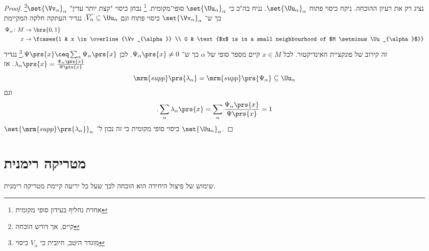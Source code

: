 \documentclass[a4paper,10pt,twoside,openany]{book}
\begin{document}
\begin{proof}
נציג רק את רעיון ההוכחה.
ניקח כיסוי פתוח
$\set{\Uu_{\alpha}}_{\alpha}$.
נניח בה"כ כי
$\set{\Uu_{\alpha}}_{\alpha}$
סופי־מקומית.%
\footnote{
אחרת נחליף בעידון סופי מקומית%
}
נבחן כיסוי "קצת יותר עדין"
$\set{\Vv_{\alpha}}_{\alpha}$\footnote{קיים, אך דורש הוכחה}
כך ש־%
$\set{\Vv_{\alpha}}_{\alpha}$
כיסוי פתוח וגם
$\overline{V_{\alpha}} \subseteq \Uu_{\alpha}$.
נגדיר העתקה חלקה המקיימת
\begin{align*}
\Psi_{\alpha} \colon M &\to \brs{0,1} \\
x &\to \fcases{1 & x \in \overline{\Vv_{\alpha}} \\ 0 & \text{$x$ is in a small neighbourhood of $M \setminus \Uu_{\alpha}$}}
\end{align*}
זה קירוב של פונקציית האינדיקטור.
לכל
$x \in M$
קיים מספר סופי של
$\alpha$
כך ש־%
$\Psi_{\alpha}\prs{x} \neq 0$.
לכן
$\Psi\prs{x} \ceq \sum_{\alpha} \Psi_{\alpha}\prs{x}$.\footnote{מוגדר היטב, חיובית כי
$V_{\alpha}$
כיסוי}
נגדיר
$\lambda_{\alpha}\prs{x} = \frac{\Psi_{\alpha}\prs{x}}{\Psi\prs{x}}$.
אז
\[\mrm{supp}\prs{\lambda_{\alpha}} = \mrm{supp}\prs{\Psi_{\alpha}} \subseteq \Uu_{\alpha}\]
וגם
\[\text{.}\sum_{\alpha} \lambda_{\alpha}\prs{x} = \sum_{\alpha} \frac{\Psi_{\alpha}\prs{x}}{\Psi\prs{x}} = 1\]
$\set{\mrm{supp}\prs{\lambda_{\alpha}}}_{\alpha}$
כיסוי סופי מקומית כי זה נכון ל־%
$\set{\Uu_{\alpha}}_{\alpha}$.
\end{proof}

\section{מטריקה רימנית}

שימוש של
פיצול היחידה הוא הוכחה לכך שעל כל יריעה קיימת מטריקה רימנית.
\end{document}
